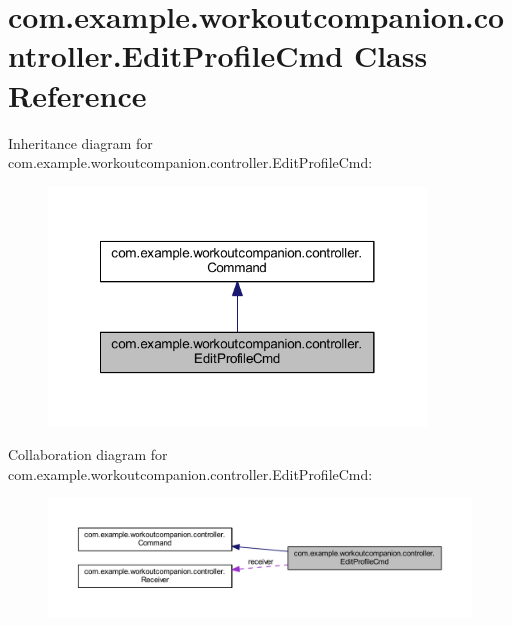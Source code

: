 \hypertarget{classcom_1_1example_1_1workoutcompanion_1_1controller_1_1_edit_profile_cmd}{\section{com.\-example.\-workoutcompanion.\-controller.\-Edit\-Profile\-Cmd Class Reference}
\label{classcom_1_1example_1_1workoutcompanion_1_1controller_1_1_edit_profile_cmd}
}


Inheritance diagram for com.\-example.\-workoutcompanion.\-controller.\-Edit\-Profile\-Cmd\-:\nopagebreak
\begin{figure}[H]
\begin{center}
\leavevmode
\includegraphics[width=284pt]{classcom_1_1example_1_1workoutcompanion_1_1controller_1_1_edit_profile_cmd__inherit__graph}
\end{center}
\end{figure}


Collaboration diagram for com.\-example.\-workoutcompanion.\-controller.\-Edit\-Profile\-Cmd\-:\nopagebreak
\begin{figure}[H]
\begin{center}
\leavevmode
\includegraphics[width=350pt]{classcom_1_1example_1_1workoutcompanion_1_1controller_1_1_edit_profile_cmd__coll__graph}
\end{center}
\end{figure}
